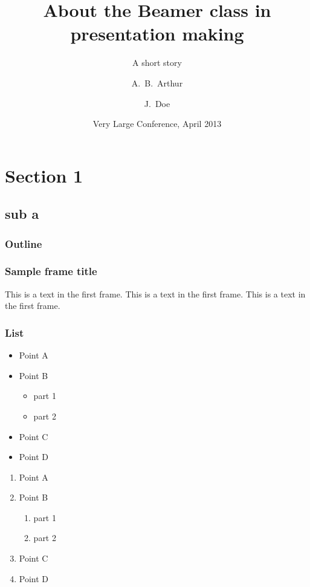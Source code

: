 \documentclass{beamer}
\title[About Beamer] %
{About the Beamer class in presentation making}
\subtitle{A short story}
\author[Arthur, Doe] %
{A.~B.~Arthur\inst{1} \and J.~Doe\inst{2}}
\institute[VFU] %
{
  \inst{1}%
  Faculty of Physics\\
  Very Famous University
  \and
  \inst{2}%
  Faculty of Chemistry\\
  Very Famous University
}
\date[VLC 2013] %
{Very Large Conference, April 2013}
\begin{document}
  \frame{\titlepage}

  \section{Section 1}
    \subsection{sub a}

      \begin{frame}
        \frametitle{Outline}
        \tableofcontents
      \end{frame}

      \begin{frame}
        \frametitle{Sample frame title}
        This is a text in the first frame. This is a text in the first frame. This is a text in the first frame.
      \end{frame}

      \begin{frame}
        \frametitle{List}
        \begin{itemize}
          \item Point A
          \item Point B
            \begin{itemize}
              \item part 1
              \item part 2
            \end{itemize}
          \item Point C
          \item Point D
        \end{itemize}
      \end{frame}

      \begin{frame}
        \begin{enumerate}[I]
          \item Point A
          \item Point B
            \begin{enumerate}[i]
              \item part 1
              \item part 2
            \end{enumerate}
          \item Point C
          \item Point D
          \end{enumerate}
      \end{frame}
\end{document}
